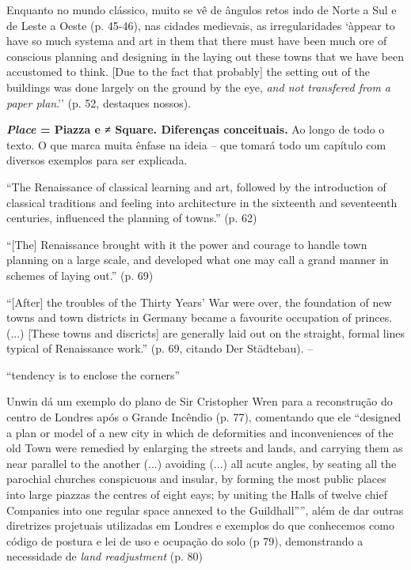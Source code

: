 \documentclass[12pt, a4paper]{book} %
\begin{document}
        Enquanto no mundo clássico, muito se vê de ângulos retos indo de Norte a Sul e de Leste a Oeste (p. 45-46), nas cidades medievais, as irregularidades `àppear to have so much systema and art in them that there must have been much ore of conscious planning and designing in the laying out these towns that we have been accustomed to think. [Due to the fact that probably] the setting out of the buildings was done largely on the ground by the eye, \textit{and not transfered from a paper plan}.'' (p. 52, destaques nossos).

        \textbf{\textit{Place} = Piazza e ≠ Square. Diferenças conceituais.} Ao longo de todo o texto. O que marca muita ênfase na ideia – que tomará todo um capítulo com diversos exemplos para ser explicada. 

        ``The Renaissance of classical learning and art, followed by the introduction of classical traditions and feeling into architecture in the sixteenth and seventeenth centuries, influenced the planning of towns.'' (p. 62)

        ``[The] Renaissance brought with it the power and courage to handle town planning on a large scale, and developed what one may call a grand manner in schemes of laying out.'' (p. 69)

        ``[After] the troubles of the Thirty Years' War were over, the foundation of new towns and town districts in Germany became a favourite occupation of princes. (...) [These towns and discricts] are generally laid out on the straight, formal lines typical of Renaissance work.'' (p. 69, citando Der Städtebau). – %

        ``tendency is to enclose the corners''

        Unwin dá um exemplo do plano de Sir Cristopher Wren para a reconstrução do centro de Londres após o Grande Incêndio (p. 77), comentando que ele ``designed a plan or model of a new city in which de deformities and inconveniences of the old Town were remedied by enlarging the streets and lands, and carrying them as near parallel to the another (...) avoiding (...) all acute angles, by seating all the parochial churches conspicuous and insular, by forming the most public places into large piazzas the centres of eight eays; by uniting the Halls of twelve chief Companies into one regular space annexed to the Guildhall'''', além de dar outras diretrizes projetuais utilizadas em Londres e exemplos do que conhecemos como código de postura e lei de uso e ocupação do solo (p 79), demonstrando a necessidade de \textit{land readjustment} (p. 80)
\end{document}
